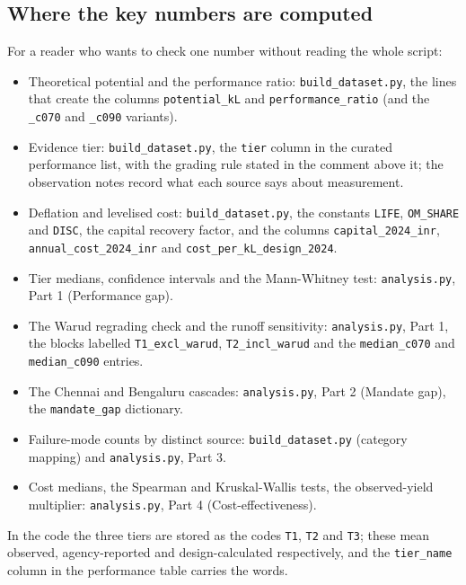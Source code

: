 \subsection{Where the key numbers are computed}

For a reader who wants to check one number without reading the whole script:

\begin{itemize}[leftmargin=1.2em,itemsep=1pt]
\item Theoretical potential and the performance ratio: \texttt{build\_dataset.py}, the lines that create the columns \texttt{potential\_kL} and \texttt{performance\_ratio} (and the \texttt{\_c070} and \texttt{\_c090} variants).
\item Evidence tier: \texttt{build\_dataset.py}, the \texttt{tier} column in the curated performance list, with the grading rule stated in the comment above it; the observation notes record what each source says about measurement.
\item Deflation and levelised cost: \texttt{build\_dataset.py}, the constants \texttt{LIFE}, \texttt{OM\_SHARE} and \texttt{DISC}, the capital recovery factor, and the columns \texttt{capital\_2024\_inr}, \texttt{annual\_cost\_2024\_inr} and \texttt{cost\_per\_kL\_design\_2024}.
\item Tier medians, confidence intervals and the Mann-Whitney test: \texttt{analysis.py}, Part 1 (Performance gap).
\item The Warud regrading check and the runoff sensitivity: \texttt{analysis.py}, Part 1, the blocks labelled \texttt{T1\_excl\_warud}, \texttt{T2\_incl\_warud} and the \texttt{median\_c070} and \texttt{median\_c090} entries.
\item The Chennai and Bengaluru cascades: \texttt{analysis.py}, Part 2 (Mandate gap), the \texttt{mandate\_gap} dictionary.
\item Failure-mode counts by distinct source: \texttt{build\_dataset.py} (category mapping) and \texttt{analysis.py}, Part 3.
\item Cost medians, the Spearman and Kruskal-Wallis tests, the observed-yield multiplier: \texttt{analysis.py}, Part 4 (Cost-effectiveness).
\end{itemize}

In the code the three tiers are stored as the codes \texttt{T1}, \texttt{T2} and \texttt{T3}; these mean observed, agency-reported and design-calculated respectively, and the \texttt{tier\_name} column in the performance table carries the words.

